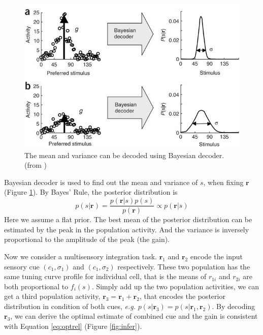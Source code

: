 \documentclass{article}[11pt]
\newcommand{\eg}{\textit{e.g. }}
\begin{document}
\begin{figure}[tpbh]
  \centering
  \includegraphics[width=.8\textwidth]{decoder}
  \caption{The mean and variance can be decoded using Bayesian decoder. (from \cite{ma_bayesian_2006})}
  \label{fig:decoder}
\end{figure}

Bayesian decoder is used to find out the mean and variance of $s$, when fixing $\mathbf{r}$ (Figure \ref{fig:decoder}). By Bayes' Rule, the posterior distribution is
\begin{equation}
  p(s|\mathbf{r}) = \frac{p(\mathbf{r}|s)p(s)}{p(\mathbf{r})} \propto p(\mathbf{r}|s)
  \label{eq:posterior}
\end{equation}
Here we assume a flat prior. The best mean of the posterior distribution can be estimated by the peak in the population activity. And the variance is inversely proportional to the amplitude of the peak (the gain).

Now we consider a multisensory integration task. $\mathbf{r}_1$ and $\mathbf{r}_2$ encode the input sensory cue $(c_1, \sigma_1)$ and $(c_1, \sigma_2)$ respectively. These two population has the same tuning curve profile for individual cell, that is the means of $r_{1i}$ and $r_{2i}$ are both proportional to $f_i(s)$. Simply add up the two population activities, we can get a third population activity, $\mathbf{r}_3 = \mathbf{r}_1 + \mathbf{r}_2$, that encodes the posterior distribution in condition of both cues, \eg $p(s|\mathbf{r}_3) = p(s|\mathbf{r}_1,\mathbf{r}_2)$. By decoding $\mathbf{r}_3$, we can derive the optimal estimate of combined cue and the gain is consistent with Equation \ref{eq:optrel} (Figure \ref{fig:infer}).
\end{document}
